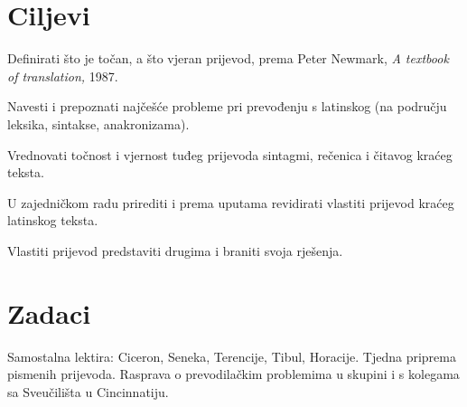 \documentclass[12pt]{article}
\begin{document}
\section*{Ciljevi} 

Definirati što je točan, a što vjeran prijevod, prema Peter Newmark, \textit{A textbook of translation,} 1987.

Navesti i prepoznati najčešće probleme pri prevođenju s latinskog (na području leksika, sintakse, anakronizama).

Vrednovati točnost i vjernost tuđeg prijevoda sintagmi, rečenica i čitavog kraćeg teksta.

U zajedničkom radu prirediti i prema uputama revidirati vlastiti prijevod kraćeg latinskog teksta.

Vlastiti prijevod predstaviti drugima i braniti svoja rješenja.

\section*{Zadaci} 

Samostalna lektira: Ciceron, Seneka, Terencije, Tibul, Horacije. Tjedna priprema pismenih prijevoda. Rasprava o prevodilačkim problemima u skupini i s kolegama sa Sveučilišta u Cincinnatiju.
\end{document}
